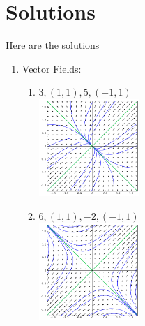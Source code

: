 {
\section{Solutions}
\small
Here are the solutions

\begin{multicols}{2}
\begin{enumerate}
\item Vector Fields:  
\newcommand{\myvfwidth}{1.5in}
\begin{enumerate}
\item $3, (1,1),  5, (-1,1)$\\ \includegraphics[width=\myvfwidth]{02-Applications/support/vfa}
\item $6, (1,1),  -2, (-1,1)$\\\includegraphics[width=\myvfwidth]{02-Applications/support/vfb}

\end{enumerate}
\end{enumerate}
\end{multicols}}
